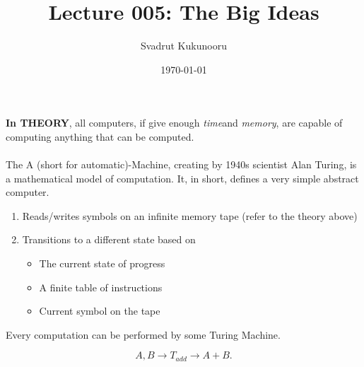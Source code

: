\documentclass[letterpaper]{report}
\title{Lecture 005: The Big Ideas}
\author{Svadrut Kukunooru}
\date{\today}
\begin{document}
\begin{titlepage}
    \maketitle
\end{titlepage}

\textbf{In THEORY}, all computers, if give enough \textit{time}and \textit{memory}, are capable of computing anything that can be computed. 
\\ \\ 
The A (short for automatic)-Machine, creating by 1940s scientist Alan Turing, is a mathematical model of computation. It, in short, defines a very simple abstract computer. 

\begin{enumerate}
    \item Reads/writes symbols on an infinite memory tape (refer to the theory above)
    \item Transitions to a different state based on 
        \begin{itemize}
            \item The current state of progress
            \item A finite table of instructions
            \item Current symbol on the tape
        \end{itemize} 
\end{enumerate}
Every computation can be performed by some Turing Machine. 

\[
    A,B \to  T_{add} \to A + B
.\] 
\end{document}
